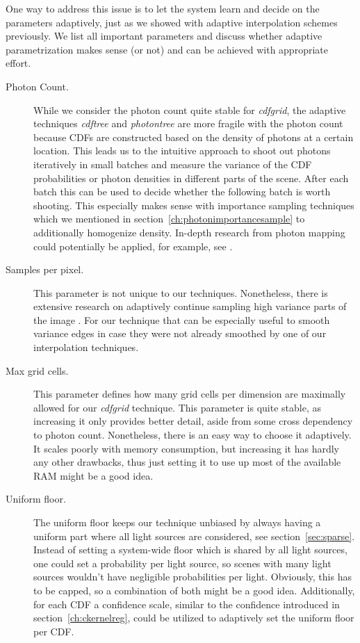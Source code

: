 One way to address this issue is to let the system learn and decide on the parameters adaptively, just as we showed with adaptive interpolation schemes previously. We list all important parameters and discuss whether adaptive parametrization makes sense (or not) and can be achieved with appropriate effort.

\begin{description}
    \item[Photon Count.] While we consider the photon count quite stable for \textit{cdfgrid}, the adaptive techniques \textit{cdftree} and \textit{photontree} are more fragile with the photon count because CDFs are constructed based on the density of photons at a certain location. This leads us to the intuitive approach to shoot out photons iteratively in small batches and measure the variance of the CDF probabilities or photon densities in different parts of the scene. After each batch this can be used to decide whether the following batch is worth shooting. This especially makes sense with importance sampling techniques which we mentioned in section~\ref{ch:photonimportancesample} to additionally homogenize density. In-depth research from photon mapping could potentially be applied, for example, see \parencite{DBLP:journals/vc/ZhengZ15}.
    \item[Samples per pixel.] This parameter is not unique to our techniques. Nonetheless, there is extensive research on adaptively continue sampling high variance parts of the image \parencite{zwicker15star}. For our technique that can be especially useful to smooth variance edges in case they were not already smoothed by one of our interpolation techniques.
    \item[Max grid cells.] This parameter defines how many grid cells per dimension are maximally allowed for our \textit{cdfgrid} technique. This parameter is quite stable, as increasing it only provides better detail, aside from some cross dependency to photon count. Nonetheless, there is an easy way to choose it adaptively. It scales poorly with memory consumption, but increasing it has hardly any other drawbacks, thus just setting it to use up most of the available RAM might be a good idea.
    \item[Uniform floor.] The uniform floor keeps our technique unbiased by always having a uniform part where all light sources are considered, see section~\ref{sec:sparse}. Instead of setting a system-wide floor which is shared by all light sources, one could set a probability per light source, so scenes with many light sources wouldn't have negligible probabilities per light. Obviously, this has to be capped, so a combination of both might be a good idea. Additionally, for each CDF a confidence scale, similar to the confidence introduced in section~\ref{ch:ckernelreg}, could be utilized to adaptively set the uniform floor per CDF.

\end{description}
